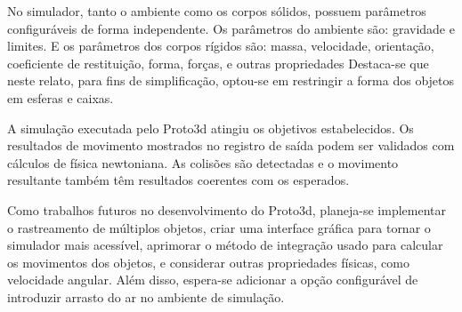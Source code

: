 \documentclass[12pt]{article}
\begin{document}
No simulador, tanto o ambiente como os corpos sólidos, possuem parâmetros configuráveis de forma independente. Os parâmetros do ambiente são:  gravidade e limites. E os parâmetros dos corpos rígidos são: massa, velocidade, orientação, coeficiente de restituição, forma, forças, e outras propriedades Destaca-se que neste relato, para fins de simplificação, optou-se em restringir a forma dos objetos em esferas e caixas.

A simulação executada pelo Proto3d atingiu os objetivos estabelecidos. Os resultados de movimento mostrados no registro de saída podem ser validados com cálculos de física newtoniana. As colisões são detectadas e o movimento resultante também têm resultados coerentes com os esperados. 

Como trabalhos futuros no desenvolvimento do Proto3d, planeja-se implementar o rastreamento de múltiplos objetos, criar uma interface gráfica para tornar o simulador mais acessível, aprimorar o método de integração usado para calcular os movimentos dos objetos, e considerar outras propriedades físicas, como velocidade angular. Além disso, espera-se adicionar a opção configurável de introduzir arrasto do ar no ambiente de simulação.



\end{document}
